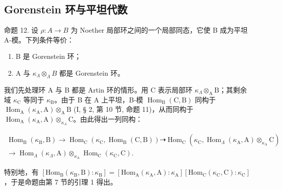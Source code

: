\subsection{Gorenstein 环与平坦代数}

命题 12. 设 \(\rho: A \to B\) 为 Noether 局部环之间的一个局部同态，它使 B 成为平坦 A-模。下列条件等价：

\begin{enumerate}
\def\labelenumi{(\roman{enumi})}
\item
  B 是 Gorenstein 环；
\item
  A 与 \(\kappa_{\Lambda} \otimes_{\Lambda} B\) 都是 Gorenstein 环。
\end{enumerate}

我们先处理环 A 与 B 都是 Artin 环的情形。用 C 表示局部环 \(\kappa_{\Lambda} \otimes_{\mathrm{A}} \mathrm{B}\)；其剩余域 \(\kappa_{\mathrm{C}}\) 等同于 \(\kappa_{\mathrm{B}}\)。由于 B 在 A 上平坦，B-模 \(\operatorname{Hom}_{\mathrm{B}}(\mathrm{C}, \mathrm{B})\) 同构于 \(\operatorname{Hom}_{\mathrm{A}}(\kappa_{\mathrm{A}}, \mathrm{A}) \otimes_{\mathrm{A}} \mathrm{B}\) (I, § 2, 第 10 节, 命题 11)，从而同构于 \(\operatorname{Hom}_{\mathrm{A}}(\kappa_{\mathrm{A}}, \mathrm{A}) \otimes_{\kappa_{\Lambda}} \mathrm{C}\)。由此得出一列同构：

\[
\begin{array}{c} \operatorname{Hom} _ {\mathrm{B}} (\kappa_ {\mathrm{B}}, \mathrm{B}) \longrightarrow \operatorname{Hom} _ {\mathrm{C}} (\kappa_ {\mathrm{C}}, \operatorname{Hom} _ {\mathrm{B}} (\mathrm{C}, \mathrm{B})) \dashrightarrow \operatorname{Hom} _ {\mathrm{C}} (\kappa_ {\mathrm{C}}, \operatorname{Hom} _ {\Lambda} (\kappa_ {\mathrm{A}}, \mathrm{A}) \otimes_ {\kappa_ {\mathrm{A}}} \mathrm{C}) \\ \longrightarrow \operatorname{Hom} _ {\Lambda} (\kappa_ {\Lambda}, \mathrm{A}) \otimes_ {\kappa_ {\mathrm{A}}} \operatorname{Hom} _ {\mathrm{C}} (\kappa_ {\mathrm{C}}, \mathrm{C}). \end{array}
\]

特别地，有 \(\left[\mathrm{Hom}_{\mathrm{B}}(\kappa_{\mathrm{B}},\mathrm{B}):\kappa_{\mathrm{B}}\right] = \left[\mathrm{Hom}_{\mathrm{A}}(\kappa_{\mathrm{A}},\mathrm{A}):\kappa_{\mathrm{A}}\right]\left[\mathrm{Hom}_{\mathrm{C}}(\kappa_{\mathrm{C}},\mathrm{C}):\kappa_{\mathrm{C}}\right]\)，于是命题由第 7 节的引理 1 得出。

